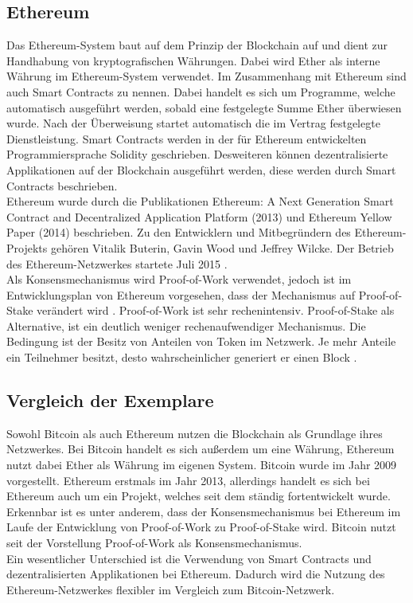 	\subsection{Ethereum}
	
		Das Ethereum-System baut auf dem Prinzip der Blockchain auf und dient zur Handhabung von kryptografischen Währungen. Dabei wird Ether als interne Währung im Ethereum-System verwendet. Im Zusammenhang mit Ethereum sind auch Smart Contracts zu nennen. Dabei handelt es sich um Programme, welche automatisch ausgeführt werden, sobald eine festgelegte Summe Ether überwiesen wurde. Nach der Überweisung startet automatisch die im Vertrag festgelegte Dienstleistung. Smart Contracts werden in der für Ethereum entwickelten Programmiersprache Solidity geschrieben. Desweiteren können dezentralisierte Applikationen auf der Blockchain ausgeführt werden, diese werden durch Smart Contracts beschrieben. \\
		Ethereum wurde durch die Publikationen Ethereum: A Next Generation Smart Contract and Decentralized Application Platform (2013) \cite{ETHW} und Ethereum Yellow Paper (2014) \cite{ETHY} beschrieben. Zu den Entwicklern und Mitbegründern des Ethereum-Projekts gehören Vitalik Buterin, Gavin Wood und Jeffrey Wilcke. Der Betrieb des Ethereum-Netzwerkes startete Juli 2015 \cite{ETHT}. \\
		Als Konsensmechanismus wird Proof-of-Work verwendet, jedoch ist im Entwicklungsplan von Ethereum vorgesehen, dass der Mechanismus auf Proof-of-Stake verändert wird \cite{ETHE}. Proof-of-Work ist sehr rechenintensiv. Proof-of-Stake als Alternative, ist ein deutlich weniger rechenaufwendiger Mechanismus. Die Bedingung ist der Besitz von Anteilen von Token im Netzwerk. Je mehr Anteile ein Teilnehmer besitzt, desto wahrscheinlicher generiert er einen Block \cite{BITB}.
		
	\subsection{Vergleich der Exemplare}
	
		Sowohl Bitcoin als auch Ethereum nutzen die Blockchain als Grundlage ihres Netzwerkes. Bei Bitcoin handelt es sich außerdem um eine Währung, Ethereum nutzt dabei Ether als Währung im eigenen System. Bitcoin wurde im Jahr 2009 vorgestellt. Ethereum erstmals im Jahr 2013, allerdings handelt es sich bei Ethereum auch um ein Projekt, welches seit dem ständig fortentwickelt wurde. Erkennbar ist es unter anderem, dass der Konsensmechanismus bei Ethereum im Laufe der Entwicklung von Proof-of-Work zu Proof-of-Stake wird. Bitcoin nutzt seit der Vorstellung Proof-of-Work als Konsensmechanismus.\\
		Ein wesentlicher Unterschied ist die Verwendung von Smart Contracts und dezentralisierten Applikationen bei Ethereum. Dadurch wird die Nutzung des Ethereum-Netzwerkes flexibler im Vergleich zum Bitcoin-Netzwerk. 		
